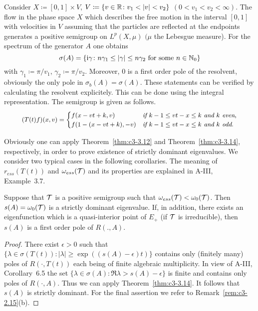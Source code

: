 \begin{example}\label{ex:c3-3.15}
	Consider $X \coloneqq  [0,1] \times V$, $V \coloneqq  \{v \in \mathbb{R}  \colon v_{1} < |v| < v_{2}\}$ $(0 < v_{1} < v_{2} < \infty)$. 
	The flow in the phase space $X$ which describes the free motion in the interval $[0,1]$ with velocities in $V$ assuming that the particles are reflected at the endpoints generates a positive semigroup on $L^{p}(X,\mu)$ $(\mu$ the Lebesgue measure). 
	For the spectrum of the generator $A$ one obtains 
    \[
    \sigma(A) = \{\mathrm{i} \gamma \colon n\gamma_{1} \leq |\gamma| \leq n\gamma_{2} \text{ for some } n \in \mathbb{N}_{0}\}
    \]
    with $\gamma_{1} \coloneqq  \pi/v_{1}$, $\gamma_{2} \coloneqq  \pi/v_{2}$. 
	Moreover, $0$ is a first order pole of the resolvent, obviously the only pole in $\sigma_{b}(A) = \sigma(A)$.
	These statements can be verified by calculating the resolvent explicitely. 
	This can be done using the integral representation. 
    The semigroup is given as follows.
\begin{equation}\label{eq:c3-3.20}
	\textit{\small $
	(T(t)f)(x,v) = \begin{cases}
		f(x-vt+k,v) & \text{if } k-1\leq vt-x\leq k \text{ and } k \textit{ even}, \\
		f(1-(x-vt+k),-v) & \text{if } k-1\leq vt-x\leq k \text{ and } k \text{ odd}.
	\end{cases}
$}
\end{equation} 

Obviously one can apply Theorem~\ref{thm:c3-3.12} and Theorem~\ref{thm:c3-3.14}, respectively, in order to prove existence of strictly dominant eigenvalues. 
We consider two typical cases in the following corollaries. 
The meaning of $r_{ess}(T(t))$ and $\omega_{ess}(\mathcal{T})$ and its properties are explained in A-III, Example~3.7.
\end{example}

\begin{corollary}\label{cor:c3-3.16}
	Suppose that $\mathcal{T}$ is a positive semigroup such that $\omega_{ess}(\mathcal{T}) < \omega_0(\mathcal{T})$. 
	Then $s(A) = \omega_0(\mathcal{T})$ is a strictly dominant eigenvalue.
	If, in addition, there exists an eigenfunction which is a quasi-interior point of $E_{+}$ (\eg if $\mathcal{T}$ is irreducible), then $s(A)$ is a first order pole of $R(.,A)$.
\end{corollary}
\begin{proof}
	There exist $\epsilon > 0$ such that 
    $\{\lambda \in \sigma(T(t)) \colon |\lambda| \geq \exp((s(A)-\epsilon)t)\}$ contains only (finitely many) poles of $R(\cdot,T(t))$ each being of finite algebraic multiplicity. 
	In view of A-III, Corollary~6.5 the set $\{\lambda \in \sigma(A) \colon \Re \lambda > s(A)-\epsilon\}$ is finite and contains only poles of $R(\cdot,A)$. 
	Thus we can apply Theorem~\ref{thm:c3-3.14}. 
	It follows that $s(A)$ is strictly dominant.
	For the final assertion we refer to Remark~\ref{rem:c3-2.15}(b).
\end{proof}

